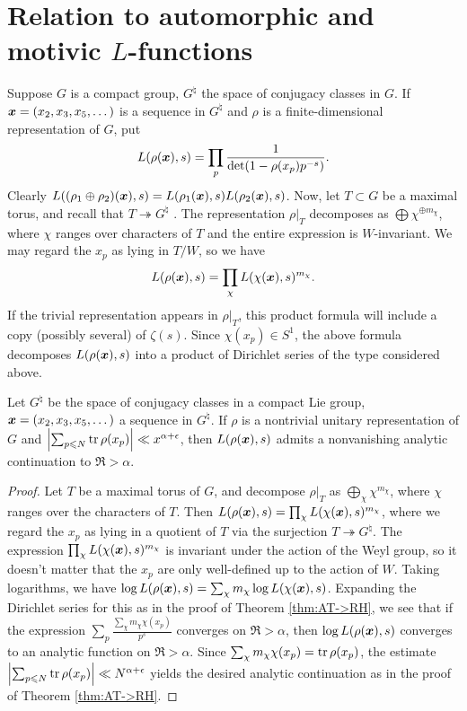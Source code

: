 \section{Relation to automorphic and motivic \texorpdfstring{$L$}{L}-functions}

Suppose $G$ is a compact group, $G^\natural$ the space of conjugacy classes in 
$G$. If ${\boldsymbol x} = (x_2,x_3,x_5,\dots)$ is a sequence in $G^\natural$ and $\rho$ is 
a finite-dimensional representation of $G$, put 
\[
	L(\rho({\boldsymbol x}),s) = \prod_p \frac{1}{\det(1-\rho(x_p) p^{-s})} .
\]
Clearly $L((\rho_1\oplus \rho_2)({\boldsymbol x}),s) = L(\rho_1({\boldsymbol x}),s) L(\rho_2({\boldsymbol x}),s)$. 
Now, let $T\subset G$ be a maximal torus, and recall that 
$T\twoheadrightarrow G^\natural$ \cite[IX.5 Prop.~5]{bourbaki-2005}. 
The representation 
$\left.\rho\right|_T$ decomposes as $\bigoplus \chi^{\oplus m_\chi}$, where 
$\chi$ ranges over characters of $T$ and the entire expression is 
$W$-invariant. We may regard the $x_p$ as lying in $T/W$, so we have 
\[
	L(\rho({\boldsymbol x}),s) = \prod_\chi L(\chi({\boldsymbol x}),s)^{m_\chi} .
\]
If the trivial representation appears in $\left.\rho\right|_T$, this product 
formula will include a copy (possibly several) of $\zeta(s)$. Since 
$\chi(x_p) \in S^1$, the above formula decomposes $L(\rho({\boldsymbol x}),s)$ into a 
product of Dirichlet series of the type considered above. 

\begin{theorem}\label{thm:AT->RH:gp}
Let $G^\natural$ be the space of conjugacy classes in a compact Lie group, 
${\boldsymbol x} = (x_2,x_3,x_5,\dots)$ a sequence in $G^\natural$. If $\rho$ is a 
nontrivial unitary representation of $G$ and 
$\left| \sum_{p\leqslant N} \operatorname{tr} \rho(x_p)\right| \ll x^{\alpha+\epsilon}$, then 
$L(\rho({\boldsymbol x}),s)$ admits a nonvanishing analytic continuation to $\Re > \alpha$. 
\end{theorem}
\begin{proof}
Let $T$ be a maximal torus of $G$, and decompose $\rho|_T$ as 
$\bigoplus_\chi \chi^{m_\chi}$, where $\chi$ ranges over the characters of $T$. 
Then $L(\rho({\boldsymbol x}),s) = \prod_\chi L(\chi({\boldsymbol x}),s)^{m_\chi}$, where we regard the 
$x_p$ as lying in a quotient of $T$ via the surjection 
$T\twoheadrightarrow G^\natural$. The expression 
$\prod_\chi L(\chi({\boldsymbol x}),s)^{m_\chi}$ is invariant under the action of the Weyl 
group, so it doesn't matter that the $x_p$ are only well-defined up to the 
action of $W$. Taking logarithms, we have 
$\log L(\rho({\boldsymbol x}),s) = \sum_\chi m_\chi \log L(\chi({\boldsymbol x}),s)$. Expanding the 
Dirichlet series for this as in the proof of Theorem \ref{thm:AT->RH}, we see 
that if the expression $\sum_p \frac{\sum_\chi m_\chi \chi(x_p)}{p^s}$ 
converges on $\Re > \alpha$, then $\log L(\rho({\boldsymbol x}),s)$ converges to an 
analytic function on $\Re > \alpha$. Since 
$\sum_\chi m_\chi \chi(x_p) = \operatorname{tr} \rho(x_p)$, the estimate 
$\left| \sum_{p\leqslant N} \operatorname{tr} \rho(x_p)\right| \ll N^{\alpha+\epsilon}$ 
yields the desired analytic continuation as in the proof of Theorem 
\ref{thm:AT->RH}. 
\end{proof}





